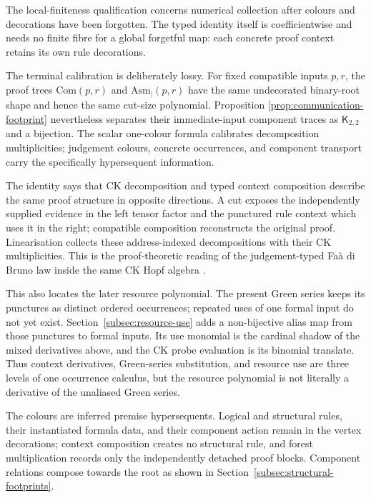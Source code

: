 \documentclass[10pt,a4paper]{article}
\theoremstyle{plain}
\theoremstyle{definition}
\theoremstyle{remark}
\begin{document}
The local-finiteness qualification concerns numerical collection after
colours and decorations have been forgotten.  The typed identity itself
is coefficientwise and needs no finite fibre for a global forgetful map:
each concrete proof context retains its own rule decorations.

The terminal calibration is deliberately lossy.  For fixed compatible
inputs \(p,r\), the proof trees
\(\mathrm{Com}(p,r)\) and
\(\mathrm{Asm}_{\mid}(p,r)\) have the same undecorated binary-root shape
and hence the same cut-size polynomial.  Proposition
\ref{prop:communication-footprint} nevertheless separates their
immediate-input component traces as \(\mathsf K_{2,2}\) and a bijection.
The scalar one-colour formula calibrates decomposition multiplicities;
judgement colours, concrete occurrences, and component transport carry
the specifically hypersequent information.

The identity says that CK decomposition and typed context composition
describe the same proof structure in opposite directions.  A cut exposes
the independently supplied evidence in the left tensor factor and the
punctured rule context which uses it in the right; compatible composition
reconstructs the original proof.  Linearisation collects these
address-indexed decompositions with their CK multiplicities.  This is the
proof-theoretic reading of the judgement-typed Fa\`a di Bruno law inside
the same CK Hopf algebra
\cite{frabettimanchon2015,galvezkocktonks2014,kockweber2019}.

This also locates the later resource polynomial.  The present Green series
keeps its punctures as distinct ordered occurrences; repeated uses of one
formal input do not yet exist.  Section~\ref{subsec:resource-use} adds a
non-bijective alias map from those punctures to formal inputs.  Its use
monomial is the cardinal shadow of the mixed derivatives above, and the CK
probe evaluation is its binomial translate.  Thus context derivatives,
Green-series substitution, and resource use are three levels of one
occurrence calculus, but the resource polynomial is not literally a
derivative of the unaliased Green series.

The colours are inferred premise hypersequents.  Logical and structural
rules, their instantiated formula data, and their component action remain
in the vertex decorations; context composition creates no structural rule,
and forest multiplication records only the independently detached proof
blocks.  Component relations compose towards the root as shown in
Section~\ref{subsec:structural-footprints}.
\end{document}
